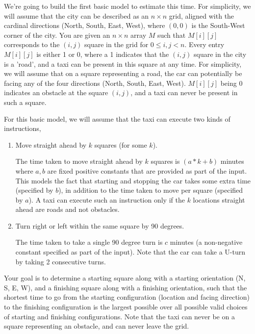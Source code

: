 \documentclass{assignment-373}
\begin{document}
\begin{enumerate}
We're going to build the first basic model to estimate this time.
%
For simplicity, we will assume that the city can be described as an
$n \times n$ grid, aligned with the cardinal directions (North, South,
East, West), where $(0,0)$ is the South-West corner of the city.
%
You are given an $n \times n$ array $M$ such that $M[i][j]$
corresponds to the $(i,j)$ square in the grid for $0 \le i, j < n.$
%
Every entry $M[i][j]$ is either 1 or 0, where a 1 indicates that the
$(i,j)$ square in the city is a 'road', and a taxi can be present in
this square at any time. For simplicity, we will assume that on a
square representing a road, the car can potentially be facing any of
the four directions (North, South, East, West).
%
$M[i][j]$ being 0 indicates an obstacle at the square $(i, j)$, and a
taxi can never be present in such a square.

For this basic model, we will assume that the taxi can execute two
kinds of instructions,
\begin{enumerate}
\item Move straight ahead by $k$ squares (for some $k$).

  The time taken to move straight ahead by $k$ squares is $(a*k + b)$
  minutes where $a, b$ are fixed positive constants that are provided
  as part of the input.
% 
  This models the fact that starting and stopping the car takes some
  extra time (specified by $b$), in addition to the time taken to move
  per square (specified by $a$).
  A taxi can execute such an instruction only if the $k$ locations
  straight ahead are roads and not obstacles.

\item Turn right or left within the same square by 90 degrees.

  The time taken to take a single 90 degree turn is $c$ minutes (a
  non-negative constant specified as part of the input). Note that the car
  can take a U-turn by taking 2 consecutive turns.
\end{enumerate}
%
%

Your goal is to determine a starting square along with a starting
orientation (N, S, E, W), and a finishing square along with a
finishing orientation, such that the shortest time to go from the
starting configuration (location and facing direction) to the
finishing configuration is the largest possible over all possible
valid choices of starting and finishing configurations.
%
Note that the taxi can never be on a square representing an obstacle,
and can never leave the grid.


\end{enumerate}
\end{document}
